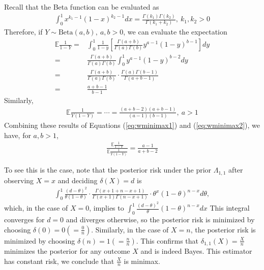 \begin{example}
    Recall that the Beta function can be evaluated as 
    \begin{gather}
        \int_0^1{x^{k_1-1}(1-x)^{k_2-1}}dx
        = \frac{\Gamma(k_1)\Gamma(k_2)}{\Gamma(k_1+k_2)}, ~k_1,k_2>0
    \end{gather}
    Therefore, if $Y\sim\text{Beta}(a,b),~a,b>0$,
    we can evaluate the expectation
    \begin{align}
        \mathbb{E}\frac{1}{1-Y}
        =& \int_0^1{\frac{1}{1-y}\left[
            \frac{\Gamma(a+b)}{\Gamma(a)\Gamma(b)}y^{a-1}(1-y)^{b-1}
        \right]}dy\\
        =& \frac{\Gamma(a+b)}{\Gamma(a)\Gamma(b)}
        \int_0^1{y^{a-1}(1-y)^{b-2}}dy\\
        =& \frac{\Gamma(a+b)}{\Gamma(a)\Gamma(b)}\cdot\frac{\Gamma(a)\Gamma(b-1)}{\Gamma(a+b-1)}\\
        =& \frac{a+b-1}{b-1}\label{eq:wminimax1}
    \end{align}
    Similarly,
    \begin{gather}
        \mathbb{E}\frac{1}{Y(1-Y)}=\cdots=\frac{(a+b-2)(a+b-1)}{(a-1)(b-1)},~a>1\label{eq:wminimax2}
    \end{gather}
    Combining these results of Equations (\ref{eq:wminimax1}) and (\ref{eq:wminimax2}), 
    we have, for $a,b>1$,
    \begin{gather}
        \frac{\mathbb{E}\frac{1}{1-Y}}{\mathbb{E}\frac{1}{Y(1-Y)}}=\frac{a-1}{a+b-2}
    \end{gather}

    To see this is the case, 
    note that the posterior risk under the prior $\Lambda_{1,1}$ after observing $X=x$
    and deciding $\delta(X)=d$ is
    \begin{gather}
        \int_0^1{
            \frac{(d-\theta)^2}{\theta(1-\theta)}
            \cdot\frac{\Gamma(x+1+n-x+1)}{\Gamma(x+1)\Gamma(n-x+1)}
            \cdot\theta^x(1-\theta)^{n-x}d\theta
        },
    \end{gather}
    which, in the case of $X=0$, implies to $\int_0^1{\frac{(d-\theta)^2}{\theta}(1-\theta)^{n-x}}dx$
    This integral converges for $d=0$ and diverges otherwise,
    so the posterior risk is minimized by choosing $\delta(0)=0(=\frac{0}{n})$.
    Similarly, in the case of $X=n$, 
    the posterior risk is minimized by choosing $\delta(n)=1(=\frac{n}{n})$. 
    This confirms that  $\delta_{1,1}(X)=\frac{X}{n}$ minimizes the posterior for any outcome $X$
    and is indeed Bayes. 
    This estimator has constant risk,
    we conclude that $\frac{X}{n}$ is minimax.
\end{example}
$~$

